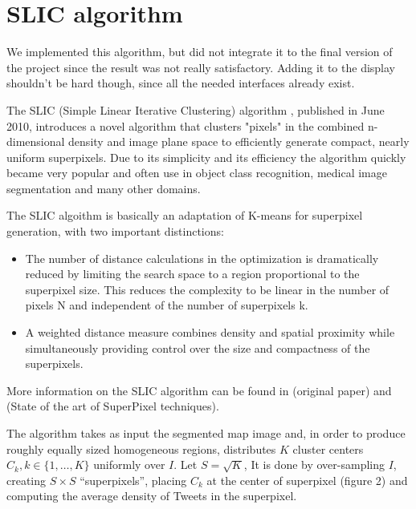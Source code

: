 \section{ SLIC algorithm}
\label{sec:K-M_clustering}

We implemented this algorithm, but did not integrate it to the final version of the project since the result was not really satisfactory. Adding it to the display shouldn't be hard though, since all the needed interfaces already exist. 

The SLIC (Simple Linear Iterative Clustering)  algorithm \cite{SLIC1}, published in June 2010, introduces a novel algorithm that clusters "pixels" in the combined n-dimensional density and image plane space to efficiently generate compact, nearly uniform superpixels. Due to its simplicity and its efficiency the algorithm quickly became very popular and often use in object class recognition, medical image segmentation and many other domains.

The SLIC algoithm is basically an adaptation of K-means for superpixel generation, with two important distinctions:

\begin{itemize}

\item The number of distance calculations in the optimization is dramatically reduced by limiting the search space to a region proportional to the superpixel size. This reduces the complexity to be linear in the number of pixels N and independent of the number of superpixels k.

\item A weighted distance measure combines density and spatial proximity while simultaneously providing control over the size and compactness of the superpixels.

\end{itemize}

More information on the SLIC algorithm can be found in \cite{SLIC1} (original paper) and \cite{SLIC2} (State of the art of SuperPixel techniques).

The algorithm takes as input the segmented map image and, in order to produce roughly equally sized homogeneous regions, distributes $K$ cluster centers $C_k, k \in \{1, \ldots, K \}$ uniformly over $I$. Let $S = \sqrt{K}$, It is done by over-sampling $I$, creating $S \times S$ ``superpixels'', placing $C_k$ at the center of superpixel (figure 2) and computing the average density of Tweets in the superpixel. 


